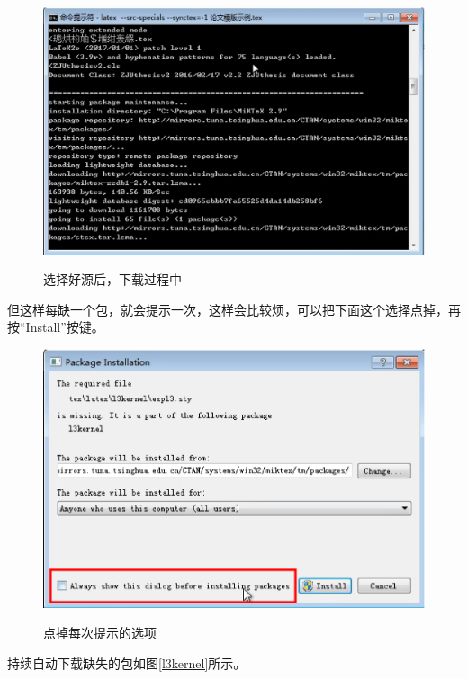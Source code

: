 \begin{figure}[th]
	\centering
	\includegraphics[scale=0.5]{./Pictures/Download.eps}\\
	\caption{选择好源后，下载过程中}
	\label{Download}
\end{figure}

\newpage

但这样每缺一个包，就会提示一次，这样会比较烦，可以把下面这个选择点掉，再按“Install”按键。

\begin{figure}[th]
	\centering
	\includegraphics[scale=0.5]{./Pictures/NoShow.eps}\\
	\caption{点掉每次提示的选项}
	\label{NoShow}
\end{figure}

持续自动下载缺失的包如图\ref{l3kernel}所示。

